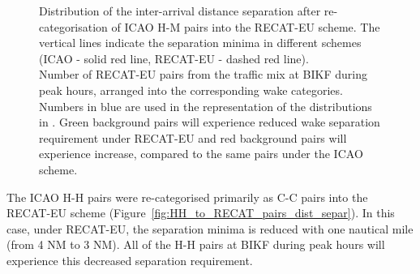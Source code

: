 \begin{figure}[h]
    \caption[Inter-arrival distance separation of ICAO H-M pairs into the RECAT-EU scheme]{\protect{} Distribution of the inter-arrival distance separation after re-categorisation of ICAO H-M pairs into the RECAT-EU scheme. The vertical lines indicate the separation minima in different schemes (ICAO - solid red line, RECAT-EU - dashed red line).\\ \protect{} Number of RECAT-EU pairs from the traffic mix at BIKF during peak hours, arranged into the corresponding wake categories. Numbers in blue are used in the representation of the distributions in \protect{}. Green background pairs will experience reduced wake separation requirement under RECAT-EU and red background pairs will experience increase, compared to the same pairs under the ICAO scheme.}
    \label{fig:HM_to_RECAT_pairs_dist_separ}
\end{figure}

The ICAO H-H pairs were re-categorised primarily as C-C pairs into the RECAT-EU scheme (Figure~\ref{fig:HH_to_RECAT_pairs_dist_separ}). In this case, under RECAT-EU, the separation minima is reduced with one nautical mile (from 4 NM to 3 NM). All of the H-H pairs at BIKF during peak hours will experience this decreased separation requirement.

